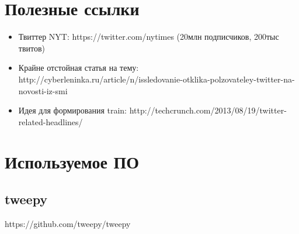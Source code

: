 


\section{Полезные ссылки}
    \begin{itemize}
        \item Твиттер NYT: https://twitter.com/nytimes (20млн подписчиков, 200тыс твитов)
        \item Крайне отстойная статья на тему: http://cyberleninka.ru/article/n/issledovanie-otklika-polzovateley-twitter-na-novosti-iz-smi
        \item Идея для формирования train: http://techcrunch.com/2013/08/19/twitter-related-headlines/
    \end{itemize}
\clearpage





\section{Используемое ПО}
    \subsection{tweepy}
        https://github.com/tweepy/tweepy